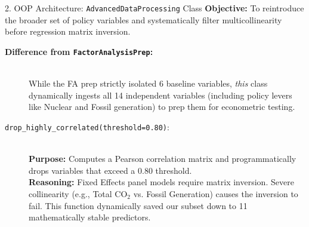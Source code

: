\documentclass[aspectratio=169]{beamer}
\begin{document}
\begin{frame}{2. OOP Architecture: \texttt{AdvancedDataProcessing} Class}
  \footnotesize 
  \textbf{Objective:} To reintroduce the broader set of policy variables and systematically filter multicollinearity before regression matrix inversion.
  \vspace{0.1cm}

  \begin{description}
      \item[\textbf{Difference from \texttt{FactorAnalysisPrep}:}] \hfill \\
      While the FA prep strictly isolated 6 baseline variables, \textit{this} class dynamically ingests all 14 independent variables (including policy levers like Nuclear and Fossil generation) to prep them for econometric testing.
      
      \item[\texttt{drop\_highly\_correlated(threshold=0.80)}:] \hfill \\
      \textbf{Purpose:} Computes a Pearson correlation matrix and programmatically drops variables that exceed a $0.80$ threshold. \\
      \textbf{Reasoning:} Fixed Effects panel models require matrix inversion. Severe collinearity (e.g., Total $\text{CO}_2$ vs. Fossil Generation) causes the inversion to fail. This function dynamically saved our subset down to 11 mathematically stable predictors.
  \end{description}
\end{frame}
\end{document}
